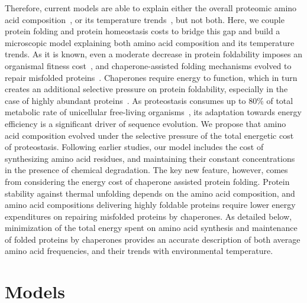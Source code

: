 \documentclass[10pt,letterpaper]{article}
\begin{document}
 Therefore, current models are able to explain either the overall proteomic amino acid composition~\cite{Seligmann2003CostMinimization,Heizer2011Amino,Krick2014Amino}, or its temperature trends~\cite{Berezovsky2007Positive,Venev2015Massively}, but not both. Here, we couple protein folding and protein homeostasis costs to bridge this gap  and build a microscopic model explaining both amino acid composition and its temperature trends.   
 As it is known, even a moderate decrease in protein foldability imposes an organismal fitness cost~\cite{Drummond2008MistranslationInduced,Samerotte2011Misfolded}, and chaperone-assisted folding mechanisms evolved to repair misfolded proteins~\cite{Hartl2011Molecular}. Chaperones require energy to function, which in turn creates an additional selective pressure on protein foldability, especially in the case of highly abundant proteins~\cite{Kepp2014Model}. As proteostasis consumes up to 80\% of total metabolic rate of  unicellular free-living organisms~\cite{Kepp2014Model}, its adaptation towards energy efficiency is a significant driver of sequence evolution.
 We propose that amino acid composition evolved under the selective pressure of the total energetic cost of proteostasis. Following earlier studies, our model includes the cost of synthesizing amino acid residues, and maintaining their constant concentrations in the presence of chemical degradation. The key new feature, however, comes from considering the energy cost of chaperone assisted protein folding. Protein stability against thermal unfolding depends on the amino acid composition, and amino acid compositions delivering highly foldable proteins require lower energy expenditures on repairing misfolded proteins by chaperones. As detailed below, minimization of the total energy spent on amino acid synthesis and maintenance of folded proteins by chaperones provides an accurate description of both average amino acid frequencies, and their trends with environmental temperature.
 
\section*{Models}
\end{document}
